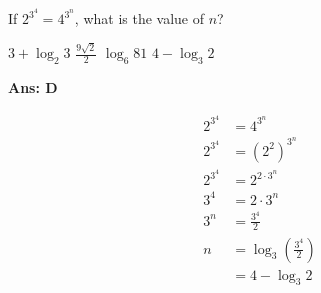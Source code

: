 \documentclass[varwidth=70mm]{standalone}
\begin{document}
If $2^{3^4} = 4^{3^n}$, what is the value of $n$?
\begin{choices}
\choice $3+\log_{2}3$
\choice $\frac{9\sqrt{2}}{2}$
\choice $\log_{6}81$
\choice $4-\log_{3}2$
\end{choices}

\begin{answer}
\hrulefill\par
\textbf{Ans: D}

\begin{equation*}
\begin{aligned}
2^{3^4} &= 4^{3^n} \\
2^{3^4} &= (2^2)^{3^n} \\
2^{3^4} &= 2^{2\cdot 3^n} \\
3^4 &= 2\cdot 3^n \\
3^n &= \frac{3^4}{2} \\
n &= \log_{3}\left(\frac{3^4}{2}\right) \\
  &= 4-\log_{3}2 
\end{aligned}
\end{equation*}
\end{answer}
\end{document}
